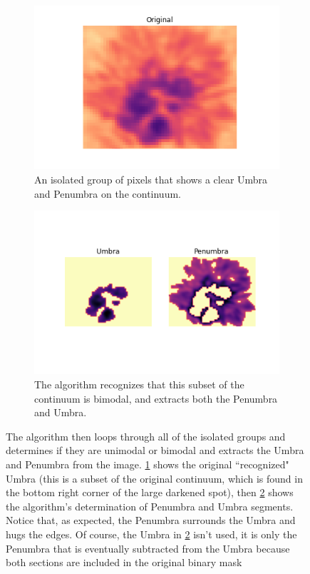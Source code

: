 \begin{enumerate}
\begin{figure}[h]
\centering
\begin{subfigure}[b]{.45\textwidth}
  \centering
  \includegraphics[width=.8\linewidth]{ThesisFilePkg/figures/data/Original_33.0.png}
  \caption{An isolated group of pixels that shows a clear Umbra and Penumbra on the continuum.}
  \label{fig:UmbraPenumbraorig}
\end{subfigure}%
\quad
\begin{subfigure}[b]{.45\textwidth}
  \centering
  \includegraphics[width=.8\linewidth]{ThesisFilePkg/figures/data/segments_33.0.png}
  \caption{The algorithm recognizes that this subset of the continuum is bimodal, and extracts both the Penumbra and Umbra.}
  \label{fig:UmbraPenumbraseg}
\end{subfigure}
\caption{The algorithm then loops through all of the isolated groups and determines if they are unimodal or bimodal and extracts the Umbra and Penumbra from the image. \ref{fig:UmbraPenumbraorig} shows the original ``recognized" Umbra (this is a subset of the original continuum, which is found in the bottom right corner of the large darkened spot), then \ref{fig:UmbraPenumbraseg} shows the algorithm's determination of Penumbra and Umbra segments. Notice that, as expected, the Penumbra surrounds the Umbra and hugs the edges. Of course, the Umbra in \ref{fig:UmbraPenumbraseg} isn't used, it is only the Penumbra that is eventually subtracted from the Umbra because both sections are included in the original binary mask}
\label{fig:binarythresh}
\end{figure}
    
    
\end{enumerate}


